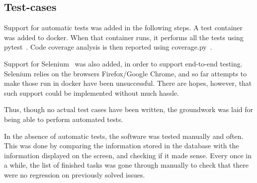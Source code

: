 \newpage

\subsection{Test-cases}

Support for automatic tests was added in the following steps. A test container
was added to docker. When that container runs, it performs all the tests
using pytest~\cite{pytest}. Code coverage analysis is then reported using
coverage.py~\cite{coverage}.

Support for Selenium~\cite{selenium} was also added, in order to support
end-to-end testing. Selenium relies on the browsers Firefox/Google Chrome,
and so far attempts to make those run in docker have been unsuccessful. There
are hopes, however, that such support could be implemented without much hassle.

Thus, though no actual test cases have been written, the groundwork was laid
for being able to perform automated tests.

In the absence of automatic tests, the software was tested manually and often.
This was done by comparing the information stored in the database with the
information displayed on the screen, and checking if it made sense. Every
once in a while, the list of finished tasks was gone through manually to
check that there were no regression on previously solved issues.
